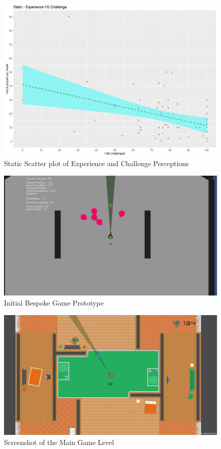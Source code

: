 \documentclass[journal]{IEEEtran}
\begin{document}
\begin{figure}[h]
	\includegraphics[width=0.75\linewidth]{staticexpvschallenge.jpg}
	\caption{Static Scatter plot of Experience and Challenge Perceptions}
	\label{fig::18}
\end{figure}

\begin{figure}[h]
	\includegraphics[width=0.75\linewidth]{secondprototype.jpg}
	\caption{Initial Bespoke Game Prototype}
	\label{fig::19}
\end{figure} 

\begin{figure}[h]
	\includegraphics[width=0.75\linewidth]{maingame.jpg}
	\caption{Screenshot of the Main Game Level}
	\label{fig::20}
\end{figure} 
\end{document}
